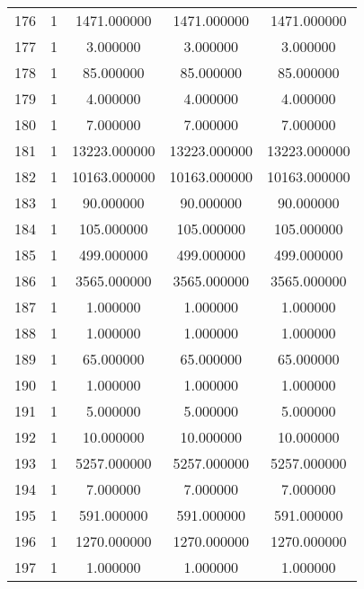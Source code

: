\documentclass[a4paper,12pt]{article}
\begin{document}
\begin{center}
\begin{longtable}{l S[table-format=3.0] S[table-format=8.2] S[table-format=8.2] S[table-format=8.2]}
        176   &   1   &  1471.000000   &   1471.000000     &    1471.000000 \\
        177   &   1   &     3.000000   &      3.000000     &       3.000000 \\
        178   &   1   &    85.000000   &     85.000000     &      85.000000 \\
        179   &   1   &     4.000000   &      4.000000     &       4.000000 \\
        180   &   1   &     7.000000   &      7.000000     &       7.000000 \\
        181   &   1   & 13223.000000   &  13223.000000     &   13223.000000 \\
        182   &   1   & 10163.000000   &  10163.000000     &   10163.000000 \\
        183   &   1   &    90.000000   &     90.000000     &      90.000000 \\
        184   &   1   &   105.000000   &    105.000000     &     105.000000 \\
        185   &   1   &   499.000000   &    499.000000     &     499.000000 \\
        186   &   1   &  3565.000000   &   3565.000000     &    3565.000000 \\
        187   &   1   &     1.000000   &      1.000000     &       1.000000 \\
        188   &   1   &     1.000000   &      1.000000     &       1.000000 \\
        189   &   1   &    65.000000   &     65.000000     &      65.000000 \\
        190   &   1   &     1.000000   &      1.000000     &       1.000000 \\
        191   &   1   &     5.000000   &      5.000000     &       5.000000 \\
        192   &   1   &    10.000000   &     10.000000     &      10.000000 \\
        193   &   1   &  5257.000000   &   5257.000000     &    5257.000000 \\
        194   &   1   &     7.000000   &      7.000000     &       7.000000 \\
        195   &   1   &   591.000000   &    591.000000     &     591.000000 \\
         196   &   1   &  1270.000000   &   1270.000000     &    1270.000000 \\
        197   &   1   &     1.000000   &      1.000000     &       1.000000 \\

\end{longtable}
\end{center}
\end{document}
